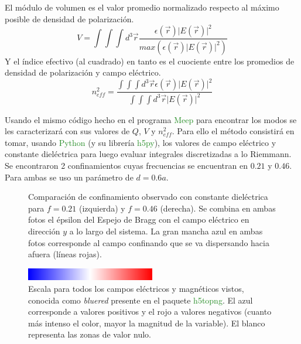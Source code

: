 \documentclass{book}
\begin{document}
El módulo de volumen es el valor promedio normalizado respecto al máximo posible de densidad de polarización.
\begin{equation}\label{eq5.2}V=\int\int\int d^3 \vec{r}\frac{\epsilon(\vec{r})\lvert E(\vec{r})\rvert^2}{max(\epsilon(\vec{r})\lvert E(\vec{r})\rvert^2)}\end{equation}
Y el índice efectivo (al cuadrado) en tanto es el cuociente entre los promedios de densidad de polarización y campo eléctrico. 
\begin{equation}\label{eq5.3}n_{eff}^2=\frac{\int\int\int d^3 \vec{r}\epsilon(\vec{r})\lvert E(\vec{r})\rvert^2}{\int\int\int d^3 \vec{r} \lvert E(\vec{r})\rvert^2}\end{equation}

Usando el mismo código hecho en el programa \textcolor{ForestGreen}{Meep} para encontrar los modos se les caracterizará con sus valores de $Q$, $V$ y $n_{eff}^2$.
Para ello el método consistirá en tomar, usando \textcolor{ForestGreen}{Python} (y su librería \textcolor{ForestGreen}{h5py}), los valores de campo eléctrico y constante dieléctrica para luego evaluar integrales discretizadas a lo Riemmann.
Se encontraron 2 confinamientos cuyas frecuencias se encuentran en $0.21$ y $0.46$. Para ambas se uso un parámetro de $d=0.6 a$.

\begin{figure}[ht]
 \centering
 \caption{Comparación de confinamiento observado con constante dieléctrica para $f=0.21$ (izquierda) y $f=0.46$ (derecha). Se combina en ambas fotos el épsilon del Espejo de Bragg con el campo eléctrico en dirección $y$ a lo largo del sistema. La gran mancha azul en ambas fotos corresponde al campo confinando que se va dispersando hacia afuera (líneas rojas).}
\end{figure}
\begin{figure}[ht]
 \centering
    \includegraphics[width=0.5\textwidth]{Bluered.png}
 \caption{Escala para todos los campos eléctricos y magnéticos vistos, conocida como \textit{bluered} presente en el paquete \textcolor{ForestGreen}{h5topng}. El azul corresponde a valores positivos y el rojo a valores negativos (cuanto más intenso el color, mayor la magnitud de la variable). El blanco representa las zonas de valor nulo.}
\end{figure}
\end{document}
